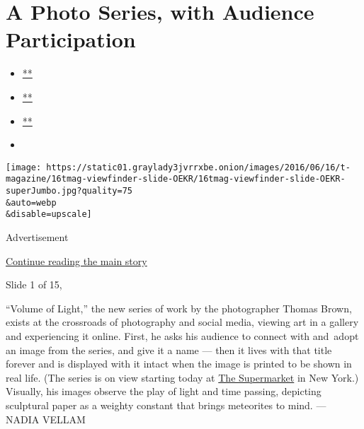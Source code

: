 \hypertarget{a-photo-series-with-audience-participation}{%
\section{A Photo Series, with Audience
Participation}\label{a-photo-series-with-audience-participation}}

\begin{itemize}
\item
  \href{https://www.facebookcorewwwi.onion/sharer.php?app_id=9869919170\&u=https\%3A\%2F\%2Fwww.nytimes3xbfgragh.onion\%2Fslideshow\%2F2016\%2F06\%2F16\%2Ft-magazine\%2Fpaper-meteorites-photos.html\%3Fsmid\%3Dfb-share\&name=A\%20Photo\%20Series\%2C\%20with\%20Audience\%20Participation\&redirect_uri=https\%3A\%2F\%2Fwww.facebookcorewwwi.onion\%2F}{**}
\item
  \href{https://twitter.com/intent/tweet?url=https\%3A\%2F\%2Fwww.nytimes3xbfgragh.onion\%2Fslideshow\%2F2016\%2F06\%2F16\%2Ft-magazine\%2Fpaper-meteorites-photos.html\%3Fsmid\%3Dtw-share\&text=A\%20Photo\%20Series\%2C\%20with\%20Audience\%20Participation}{**}
\item
  \href{mailto:?subject=nytimes3xbfgragh.onion\%3A\%20A\%20Photo\%20Series\%2C\%20with\%20Audience\%20Participation\&body=From\%20The\%20New\%20York\%20Times\%3A\%0A\%0AA\%20Photo\%20Series\%2C\%20with\%20Audience\%20Participation\%0A\%0AThe\%20photographer\%20Thomas\%20Brown\%20depicts\%20sculptural\%20still\%20lifes\%20of\%20crumpled\%20paper\%20that\%20resemble\%20meteorites\%20\%E2\%80\%94\%20and\%20then\%20asks\%20viewers\%20to\%20\%E2\%80\%9Cadopt\%E2\%80\%9D\%20and\%20name\%20them.\%0A\%0Ahttps\%3A\%2F\%2Fwww.nytimes3xbfgragh.onion\%2Fslideshow\%2F2016\%2F06\%2F16\%2Ft-magazine\%2Fpaper-meteorites-photos.html\%3Fsmid\%3Dem-share}{**}
\item
\end{itemize}

\texttt{[image: https://static01.graylady3jvrrxbe.onion/images/2016/06/16/t-magazine/16tmag-viewfinder-slide-OEKR/16tmag-viewfinder-slide-OEKR-superJumbo.jpg?quality=75\\\&auto=webp\\\&disable=upscale]}

Advertisement

\protect\hyperlink{after-right-0}{Continue reading the main story}

Slide 1 of 15,

``Volume of Light,'' the new series of work by the photographer Thomas
Brown, exists at the crossroads of photography and social media, viewing
art in a gallery and experiencing it online. First, he asks his audience
to connect with and~adopt an image from the series, and give it a name
--- then it lives with that title forever and is displayed with it
intact when the image is printed to be shown in real life. (The series
is on view starting today at \href{http://www.supermarket393.com/}{The
Supermarket} in New York.) Visually, his images observe the play of
light and time passing, depicting sculptural paper as a weighty constant
that brings meteorites to mind. --- NADIA VELLAM~

